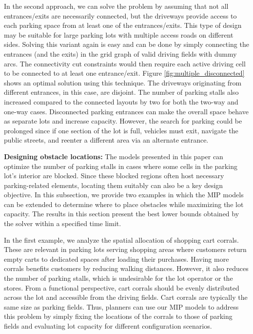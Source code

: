 \documentclass[10pt]{article}
\theoremstyle{definition}
\begin{document}
In the second approach, we can solve the problem by assuming that not all entrances/exits are necessarily connected, but the driveways provide access to each parking space from at least one of the entrances/exits. This type of design may be suitable for large parking lots with multiple access roads on different sides. Solving this variant again is easy and can be done by simply connecting the entrances (and the exits) in the grid graph of valid driving fields with dummy arcs. The connectivity cut constraints would then require each active driving cell to be connected to at least one entrance/exit. Figure \ref{fig:multiple_disconnected} shows an optimal solution using this technique. The driveways originating from different entrances, in this case, are disjoint. The number of parking stalls also increased compared to the connected layouts by two for both the two-way and one-way cases. Disconnected parking entrances can make the overall space behave as separate lots and increase capacity. However, the search for parking could be prolonged since if one section of the lot is full, vehicles must exit, navigate the public streets, and reenter a different area via an alternate entrance.

\textbf{Designing obstacle locations:} The models presented in this paper can optimize the number of parking stalls in cases where some cells in the parking lot's interior are blocked. Since these blocked regions often host necessary parking-related elements, locating them suitably can also be a key design objective. In this subsection, we provide two examples in which the MIP models can be extended to determine where to place obstacles while maximizing the lot capacity. The results in this section present the best lower bounds obtained by the solver within a specified time limit.

In the first example, we analyze the spatial allocation of shopping cart corrals. These are relevant in parking lots serving shopping areas where customers return empty carts to dedicated spaces after loading their purchases. Having more corrals benefits customers by reducing walking distances. However, it also reduces the number of parking stalls, which is undesirable for the lot operator or the stores. From a functional perspective, cart corrals should be evenly distributed across the lot and accessible from the driving fields. Cart corrals are typically the same size as parking fields. Thus, planners can use our MIP models to address this problem by simply fixing the locations of the corrals to those of parking fields and evaluating lot capacity for different configuration scenarios. 
\end{document}
